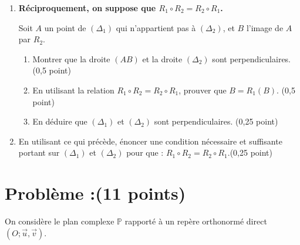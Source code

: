 \documentclass[11pt]{article}
\begin{document}
\begin{enumerate}
\item \textbf{ Réciproquement, on suppose que \( R_1 \circ R_2 = R_2 \circ R_1 \).}

Soit \( A \) un point de \( (\Delta_1) \) qui n’appartient pas à \( (\Delta_2) \), et \( B \) l’image de \( A \) par \( R_2 \).

\begin{enumerate}[label=\alph*)]
    \item Montrer que la droite \( (AB) \) et la droite \( (\Delta_2) \) sont perpendiculaires. \hfill (0,5 point)

    \item En utilisant la relation \( R_1 \circ R_2 = R_2 \circ R_1 \), prouver que \( B = R_1(B) \). \hfill (0,5 point)

    \item En déduire que \( (\Delta_1) \) et \( (\Delta_2) \) sont perpendiculaires. \hfill (0,25 point)
\end{enumerate}

\item En utilisant ce qui précède, énoncer une condition nécessaire et suffisante portant sur \( (\Delta_1) \) et \( (\Delta_2) \) pour que : \( R_1 \circ R_2 = R_2 \circ R_1. \)\hfill (0,25 point)
\end{enumerate}



\section*{Problème :(11 points)}

On considère le plan complexe \( \mathbb{P} \) rapporté à un repère orthonormé direct \( (O; \vec{u}, \vec{v}) \).
\end{document}
